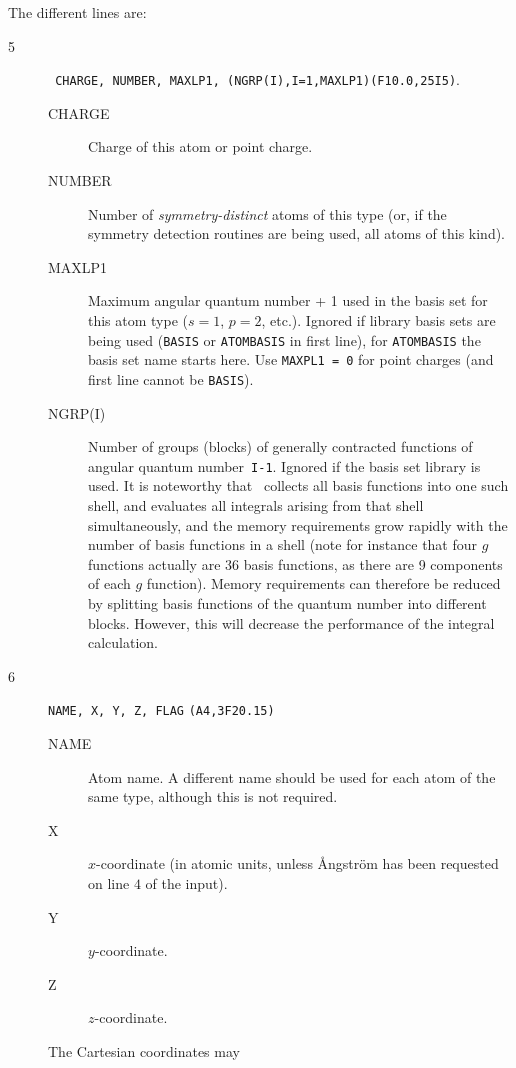 The different lines are:
\begin{description}
\item[5] \verb| CHARGE, NUMBER, MAXLP1, (NGRP(I),I=1,MAXLP1)|{\tt (F10.0,25I5)}.
\begin{description}
\item[CHARGE] Charge of this atom or point charge.
\item[NUMBER] Number of {\em symmetry-distinct} atoms of
this type (or, if the symmetry detection routines are being used, all
atoms of this kind).
\item[MAXLP1] Maximum angular quantum number + 1 used in the
basis set for this atom type ($s=1$, $p=2$, etc.).
Ignored if library basis sets are being used
(\verb|BASIS| or \verb|ATOMBASIS| in first line),
for \verb|ATOMBASIS| the basis set name starts here.
Use \verb|MAXPL1 = 0| for point charges (and first line cannot be \verb|BASIS|).
\item[NGRP(I)] Number of groups (blocks) of generally contracted
functions of angular quantum number~{\tt I-1}.
Ignored if the basis set library is used. \newline
It is noteworthy that
\dalton\ collects all basis functions into one such shell, and
evaluates all integrals arising from that 
shell simultaneously, and
the memory requirements grow rapidly with the number of basis
functions in a shell (note for instance that four $g$ functions
actually are 36
basis functions, as there are 9 components of each $g$
function). Memory requirements can therefore be reduced
by splitting
basis functions of the quantum number into different blocks. However,
this will decrease the performance of the
integral calculation.
\end{description}
\item[6] \verb|NAME, X, Y, Z, FLAG| {\tt (A4,3F20.15)}
\begin{description}
\item[NAME] Atom name.  A different name should be used for
each atom of the same type, although this is not required.
\item[X] $x$-coordinate (in atomic units, unless \AA ngstr\"{o}m
has been requested on line $4$ of the input).
\item[Y] $y$-coordinate.
\item[Z] $z$-coordinate.
\end{description}
The Cartesian coordinates may

\end{description}
